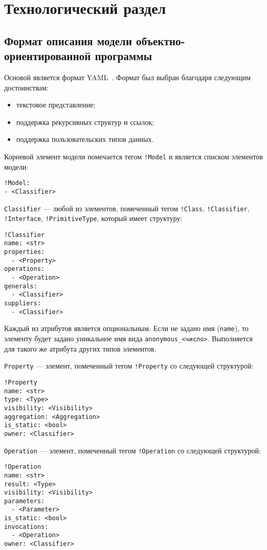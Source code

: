 \chapter{Технологический раздел}
\label{cha:implementation}

\section{Формат описания модели объектно-ориентированной программы}

Основой является формат YAML~\cite{YAML}.
Формат был выбран благодаря следующим достоинствам:
\begin{itemize}
\item текстовое представление;
\item поддержка рекурсивных структур и ссылок;
\item поддержка пользовательских типов данных.
\end{itemize}

Корневой элемент модели помечается тегом \verb;!Model; и является списком элементов
модели:
\begin{verbatim}
!Model:
- <Classifier>
\end{verbatim}

\verb;Classifier; --- любой из элементов, помеченный тегом \verb;!Class;,
\verb;!Classifier;, \verb;!Interface;, \verb;!PrimitiveType;,
который имеет структуру:
\begin{verbatim}
!Classifier
name: <str>
properties:
  - <Property>
operations:
  - <Operation>
generals:
  - <Classifier>
suppliers:
  - <Classifier>
\end{verbatim}

Каждый из атрибутов является опциональным.
Если не задано имя (\verb;name;), то элементу будет задано уникальное
имя вида \verb;anonymous_<число>;.
Выполняется для такого же атрибута других типов элементов.

\verb;Property; --- элемент, помеченный тегом \verb;!Property; со следующей
структурой:
\begin{verbatim}
!Property
name: <str>
type: <Type>
visibility: <Visibility>
aggregation: <Aggregation>
is_static: <bool>
owner: <Classifier>
\end{verbatim}

\verb;Operation; --- элемент, помеченный тегом \verb;!Operation; со следующей
структурой:
\begin{verbatim}
!Operation
name: <str>
result: <Type>
visibility: <Visibility>
parameters:
  - <Parameter>
is_static: <bool>
invocations:
  - <Operation>
owner: <Classifier>
\end{verbatim}

